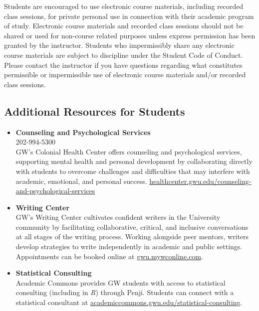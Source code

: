 \documentclass[12pt,letterpaper]{article}
\begin{document}
Students are encouraged to use electronic course materials, including recorded class sessions, for private personal use in connection with their academic program of study. Electronic course materials and recorded class sessions should not be shared or used for non-course related purposes unless express permission has been granted by the instructor. Students who impermissibly share any electronic course materials are subject to discipline under the Student Code of Conduct. Please contact the instructor if you have questions regarding what constitutes permissible or impermissible use of electronic course materials and/or recorded class sessions.

\subsection*{Additional Resources for Students}

\begin{itemize}
    \item \textbf{Counseling and Psychological Services} \\
    202-994-5300 \\
    GW’s Colonial Health Center offers counseling and psychological services, supporting mental health and personal development by collaborating directly with students to overcome challenges and difficulties that may interfere with academic, emotional, and personal success. \href{https://healthcenter.gwu.edu/counseling-and-psychological-services}{healthcenter.gwu.edu/counseling-and-psychological-services}
    \item \textbf{Writing Center} \\
    GW’s Writing Center cultivates confident writers in the University community by facilitating collaborative, critical, and inclusive conversations at all stages of the writing process. Working alongside peer mentors, writers develop strategies to write independently in academic and public settings. Appointments can be booked online at \href{https://gwu.mywconline.com}{gwu.mywconline.com}.
    \item \textbf{Statistical Consulting} \\
    Academic Commons provides GW students with access to statistical consulting (including in \textit{R}) through Penji. Students can connect with a statistical consultant at \href{https://academiccommons.gwu.edu/statistical-consulting}{academiccommons.gwu.edu/statistical-consulting}.
\end{itemize}
\vspace{-.5em}
\end{document}
